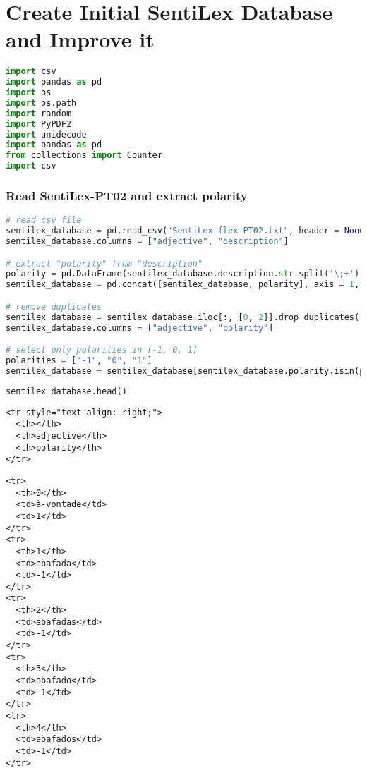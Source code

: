 \section{Create Initial SentiLex Database and Improve
it}\label{create-initial-sentilex-database-and-improve-it}

\begin{lstlisting}[language=Python]
import csv
import pandas as pd
import os
import os.path
import random
import PyPDF2
import unidecode
import pandas as pd
from collections import Counter
import csv
\end{lstlisting}

\subsubsection{Read SentiLex-PT02 and extract
polarity}\label{read-sentilex-pt02-and-extract-polarity}

\begin{lstlisting}[language=Python]
# read csv file
sentilex_database = pd.read_csv("SentiLex-flex-PT02.txt", header = None)
sentilex_database.columns = ["adjective", "description"]

# extract "polarity" from "description"
polarity = pd.DataFrame(sentilex_database.description.str.split('\;+').str[3].str.split('\=+').str[1])
sentilex_database = pd.concat([sentilex_database, polarity], axis = 1, join = 'outer')

# remove duplicates
sentilex_database = sentilex_database.iloc[:, [0, 2]].drop_duplicates()
sentilex_database.columns = ["adjective", "polarity"]

# select only polarities in [-1, 0, 1]
polarities = ["-1", "0", "1"]
sentilex_database = sentilex_database[sentilex_database.polarity.isin(polarities)]
\end{lstlisting}

\begin{lstlisting}[language=Python]
sentilex_database.head()
\end{lstlisting}

\begin{lstlisting}
<tr style="text-align: right;">
  <th></th>
  <th>adjective</th>
  <th>polarity</th>
</tr>
\end{lstlisting}

\begin{lstlisting}
<tr>
  <th>0</th>
  <td>à-vontade</td>
  <td>1</td>
</tr>
<tr>
  <th>1</th>
  <td>abafada</td>
  <td>-1</td>
</tr>
<tr>
  <th>2</th>
  <td>abafadas</td>
  <td>-1</td>
</tr>
<tr>
  <th>3</th>
  <td>abafado</td>
  <td>-1</td>
</tr>
<tr>
  <th>4</th>
  <td>abafados</td>
  <td>-1</td>
</tr>
\end{lstlisting}


